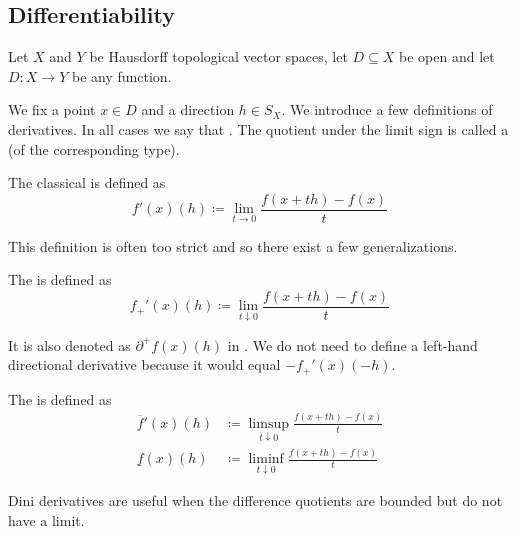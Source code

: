 \subsection{Differentiability}\label{subsec:differentiability}

Let \( X \) and \( Y \) be Hausdorff topological vector spaces, let \( D \subseteq X \) be open and let \( D: X \to Y \) be any function.

\begin{definition}\label{def:derivatives}
  We fix a point \( x \in D \) and a direction \( h \in S_X \). We introduce a few definitions of derivatives. In all cases we say that . The quotient under the limit sign is called a  (of the corresponding type).

  \begin{defenum}
     The classical  is defined as
    \begin{equation*}
      f'(x)(h) \coloneqq \lim_{t \to 0} \frac {f(x + th) - f(x)} t
    \end{equation*}

    This definition is often too strict and so there exist a few generalizations.

    \cite[lemma 1.2]{Phelps1993} The  is defined as
    \begin{equation*}
      f_+'(x)(h) \coloneqq \lim_{t \downarrow 0} \frac {f(x + th) - f(x)} t
    \end{equation*}

    It is also denoted as \( \partial^+ f(x)(h) \) in \cite[lemma 1.2]{Phelps1993}. We do not need to define a left-hand directional derivative because it would equal \( -f_+'(x)(-h) \).

    \cite[definition 11.18]{Clarke2013} The  is defined as
    \begin{align*}
      \overline f'(x)(h) &\coloneqq \limsup_{t \downarrow 0} \frac {f(x + th) - f(x)} t
      \\
      \underline f(x)(h) &\coloneqq \liminf_{t \downarrow 0} \frac {f(x + th) - f(x)} t
    \end{align*}

    Dini derivatives are useful when the difference quotients are bounded but do not have a limit.


\end{defenum}
\end{definition}
